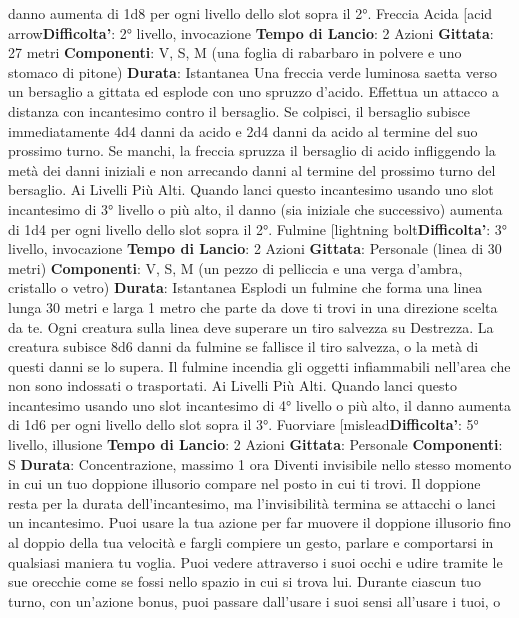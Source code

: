 \begin{multicols}{2}
danno aumenta di 1d8 per ogni livello dello slot sopra il
2°.
Freccia Acida
[acid arrow\textbf{Difficolta'}:
2° livello, invocazione
\textbf{Tempo di Lancio}: 2 Azioni
\textbf{Gittata}: 27 metri
\textbf{Componenti}: V, S, M (una foglia di rabarbaro in
polvere e uno stomaco di pitone)
\textbf{Durata}: Istantanea
Una freccia verde luminosa saetta verso un bersaglio a
gittata ed esplode con uno spruzzo d’acido. Effettua un
attacco a distanza con incantesimo contro il bersaglio.
Se colpisci, il bersaglio subisce immediatamente 4d4
danni da acido e 2d4 danni da acido al termine del suo
prossimo turno. Se manchi, la freccia spruzza il
bersaglio di acido infliggendo la metà dei danni iniziali e
non arrecando danni al termine del prossimo turno del
bersaglio.
Ai Livelli Più Alti. Quando lanci questo incantesimo
usando uno slot incantesimo di 3° livello o più alto, il
danno (sia iniziale che successivo) aumenta di 1d4 per
ogni livello dello slot sopra il 2°.
Fulmine
[lightning bolt\textbf{Difficolta'}:
3° livello, invocazione
\textbf{Tempo di Lancio}: 2 Azioni
\textbf{Gittata}: Personale (linea di 30 metri)
\textbf{Componenti}: V, S, M (un pezzo di pelliccia e una
verga d’ambra, cristallo o vetro)
\textbf{Durata}: Istantanea
Esplodi un fulmine che forma una linea lunga 30 metri e
larga 1 metro che parte da dove ti trovi in una
direzione scelta da te.
Ogni creatura sulla linea deve superare un tiro salvezza
su Destrezza. La creatura subisce 8d6 danni da fulmine
se fallisce il tiro salvezza, o la metà di questi danni se lo
supera.
Il fulmine incendia gli oggetti infiammabili nell’area che
non sono indossati o trasportati.
Ai Livelli Più Alti. Quando lanci questo incantesimo
usando uno slot incantesimo di 4° livello o più alto, il
danno aumenta di 1d6 per ogni livello dello slot sopra il
3°.
Fuorviare
[mislead\textbf{Difficolta'}:
5° livello, illusione
\textbf{Tempo di Lancio}: 2 Azioni
\textbf{Gittata}: Personale
\textbf{Componenti}: S
\textbf{Durata}: Concentrazione, massimo 1 ora
Diventi invisibile nello stesso momento in cui un tuo
doppione illusorio compare nel posto in cui ti trovi. Il
doppione resta per la durata dell’incantesimo, ma
l’invisibilità termina se attacchi o lanci un incantesimo.
Puoi usare la tua azione per far muovere il doppione
illusorio fino al doppio della tua velocità e fargli
compiere un gesto, parlare e comportarsi in qualsiasi
maniera tu voglia.
Puoi vedere attraverso i suoi occhi e udire tramite le
sue orecchie come se fossi nello spazio in cui si trova
lui. Durante ciascun tuo turno, con un’azione bonus,
puoi passare dall’usare i suoi sensi all’usare i tuoi, o

\end{multicols}
